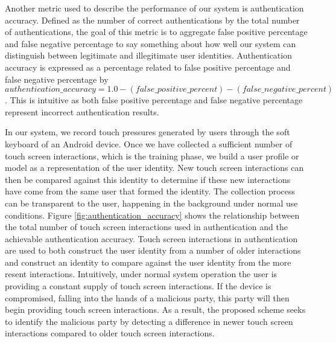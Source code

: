 
Another metric used to describe the performance of our system
is authentication accuracy.
%
Defined as the 
number of correct authentications by
the total number of authentications,
the goal of this metric is to
aggregate
false positive percentage and
false negative percentage 
to say something about how well our system can distinguish between
legitimate and illegitimate user identities.
%
Authentication accuracy is 
expressed as a percentage
related to 
false positive percentage and
false negative percentage by
$authentication\_accuracy = 1.0 - (false\_positive\_percent) - (false\_negative\_percent)$.
%
This is intuitive as both 
false positive percentage and
false negative percentage 
represent incorrect authentication results.

%
In our system, we record touch pressures generated by 
users through the soft keyboard of an Android device. 
Once we have collected a sufficient number of touch screen interactions, 
which is the training phase, we build 
a user profile or model
as a representation of the user identity.
%
New touch screen interactions can then be compared
against this identity to determine if
these new interactions have come from the same user
that formed the identity.
%
The collection process can be transparent to the user,
happening in the background under normal use conditions.
%
Figure \ref{fig:authentication_accuracy} 
shows the relationship between
the total number of touch screen interactions used in authentication
and the achievable authentication accuracy.
%
Touch screen interactions in authentication
are used to both
construct the user identity from a number of older interactions and
construct an identity to compare against the user identity 
from the more resent interactions.
%
Intuitively,
under normal system operation
the user is providing a constant supply of touch screen interactions.
If the device is compromised,
falling into the hands of a malicious party,
this party will then begin providing touch screen interactions.
As a result,
the proposed scheme seeks to identify the malicious party
by detecting a difference in newer touch screen interactions
compared to older touch screen interactions.

